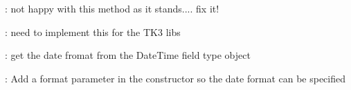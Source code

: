 
\begin{DoxyRefList}
\item[\label{todo__todo000003}%
\hypertarget{todo__todo000003}{}%
Member \hyperlink{classTk_1_1Db_1_1Model_a070f0d8f100f722bc3890bda154bc0b4}{Tk\+:\+:get\+Mapper} (\$mapper\+Class= '', \$config=null)]\+: not happy with this method as it stands.... fix it!  
\item[\label{todo__todo000004}%
\hypertarget{todo__todo000004}{}%
Class \hyperlink{classTk_1_1Dom_1_1Modifier_1_1Filter_1_1Less}{Tk} ]\+: need to implement this for the T\+K3 libs  
\item[\label{todo__todo000001}%
\hypertarget{todo__todo000001}{}%
Class \hyperlink{classTk_1_1Form_1_1Renderer_1_1Dom_1_1Field_1_1Date}{Tk} ]\+: get the date fromat from the Date\+Time field type object 
\item[\label{todo__todo000002}%
\hypertarget{todo__todo000002}{}%
Class \hyperlink{classTk_1_1Form_1_1Type_1_1DateTime}{Tk} ]\+: Add a format parameter in the constructor so the date format can be specified
\end{DoxyRefList}
